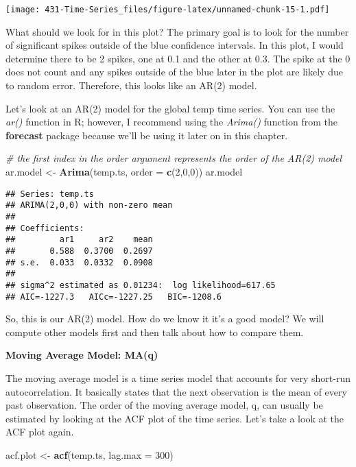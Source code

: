 \documentclass[
]{book}
\newenvironment{Shaded}{\begin{snugshade}}{\end{snugshade}}
\newcommand{\CommentTok}[1]{\textcolor[rgb]{0.56,0.35,0.01}{\textit{#1}}}
\newcommand{\DataTypeTok}[1]{\textcolor[rgb]{0.13,0.29,0.53}{#1}}
\newcommand{\DecValTok}[1]{\textcolor[rgb]{0.00,0.00,0.81}{#1}}
\newcommand{\KeywordTok}[1]{\textcolor[rgb]{0.13,0.29,0.53}{\textbf{#1}}}
\newcommand{\NormalTok}[1]{#1}
\newcommand{\StringTok}[1]{\textcolor[rgb]{0.31,0.60,0.02}{#1}}
\begin{document}
\texttt{[image: 431-Time-Series\_files/figure-latex/unnamed-chunk-15-1.pdf]}

What should we look for in this plot? The primary goal is to look for the number of significant spikes outside of the blue confidence intervals. In this plot, I would determine there to be 2 spikes, one at 0.1 and the other at 0.3. The spike at the 0 does not count and any spikes outside of the blue later in the plot are likely due to random error. Therefore, this looks like an AR(2) model.

Let's look at an AR(2) model for the global temp time series. You can use the \emph{ar()} function in R; however, I recommend using the \emph{Arima()} function from the \textbf{forecast} package because we'll be using it later on in this chapter.

\begin{Shaded}
\begin{Highlighting}[]
\CommentTok{# the first index in the order argument represents the order of the AR(2) model}
\NormalTok{ar.model <-}\StringTok{ }\KeywordTok{Arima}\NormalTok{(temp.ts, }\DataTypeTok{order =} \KeywordTok{c}\NormalTok{(}\DecValTok{2}\NormalTok{,}\DecValTok{0}\NormalTok{,}\DecValTok{0}\NormalTok{))}
\NormalTok{ar.model}
\end{Highlighting}
\end{Shaded}

\begin{verbatim}
## Series: temp.ts 
## ARIMA(2,0,0) with non-zero mean 
## 
## Coefficients:
##         ar1     ar2    mean
##       0.588  0.3700  0.2697
## s.e.  0.033  0.0332  0.0908
## 
## sigma^2 estimated as 0.01234:  log likelihood=617.65
## AIC=-1227.3   AICc=-1227.25   BIC=-1208.6
\end{verbatim}

So, this is our AR(2) model. How do we know it it's a good model? We will compute other models first and then talk about how to compare them.

\textbf{Moving Average Model: MA(q)}

The moving average model is a time series model that accounts for very short-run autocorrelation. It basically states that the next observation is the mean of every past observation. The order of the moving average model, q, can usually be estimated by looking at the ACF plot of the time series. Let's take a look at the ACF plot again.

\begin{Shaded}
\begin{Highlighting}[]
\NormalTok{acf.plot <-}\StringTok{ }\KeywordTok{acf}\NormalTok{(temp.ts, }\DataTypeTok{lag.max =} \DecValTok{300}\NormalTok{)}
\end{Highlighting}
\end{Shaded}
\end{document}
